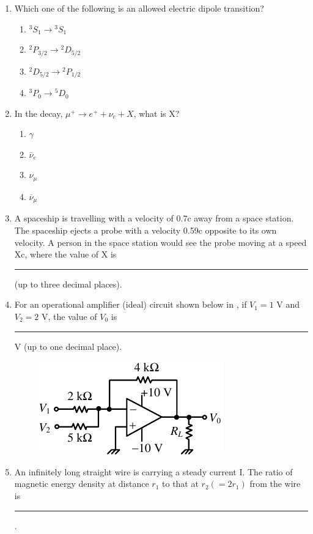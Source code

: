 \documentclass[journal,12pt,onecolumn]{IEEEtran}
\theoremstyle{remark}
\begin{document}
\begin{enumerate}
    \item Which one of the following is an allowed electric dipole transition?
    \hfill{} \begin{enumerate}
        \item ${}^3S_1 \rightarrow {}^3S_1$
        \item ${}^2P_{3/2} \rightarrow {}^2D_{5/2}$
        \item ${}^2D_{5/2} \rightarrow {}^2P_{1/2}$
        \item ${}^3P_0 \rightarrow {}^5D_0$
    \end{enumerate}

    \item In the decay, $\mu^+ \rightarrow e^+ + \nu_e + X$, what is X?
    \hfill{} \begin{enumerate}
        \item $\gamma$
        \item $\overline{\nu}_e$
        \item $\nu_\mu$
        \item $\overline{\nu}_\mu$
    \end{enumerate}

    \item A spaceship is travelling with a velocity of 0.7c away from a space station. The spaceship ejects a probe with a velocity 0.59c opposite to its own velocity. A person in the space station would see the probe moving at a speed Xc, where the value of X is \rule{1cm}{0.4pt} (up to three decimal places).
\hfill{}
    \item For an operational amplifier (ideal) circuit shown below in , if $V_1 = 1$ V and $V_2 = 2$ V, the value of $V_0$ is \rule{1cm}{0.4pt} V (up to one decimal place).
    \begin{figure}[H]
        \centering
        \caption{} \label{fig:30} \includegraphics{figs/30.png}
    \end{figure}\hfill{}

    \item An infinitely long straight wire is carrying a steady current I. The ratio of magnetic energy density at distance $r_1$ to that at $r_2 (= 2r_1)$ from the wire is \rule{1cm}{0.4pt}.\hfill{}


\end{enumerate}
\end{document}
